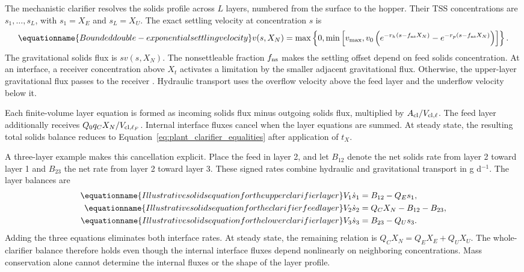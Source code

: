 The mechanistic clarifier resolves the solids profile across $L$ layers, numbered from the surface to the hopper. Their TSS concentrations are $s_1,\ldots,s_L$, with $s_1=X_E$ and $s_L=X_U$. The exact settling velocity at concentration $s$ is
\begin{equation}
\equationname{Bounded double-exponential settling velocity}
v(s,X_N)=\max\left\{0,\min\left[v_{\max},
v_0\left(e^{-r_h(s-f_{\rm ns}X_N)}-e^{-r_p(s-f_{\rm ns}X_N)}\right)\right]\right\}.
\label{eq:plant_settling_velocity}
\end{equation}
The gravitational solids flux is $sv(s,X_N)$. The nonsettleable fraction $f_{\rm ns}$ makes the settling offset depend on feed solids concentration. At an interface, a receiver concentration above $X_t$ activates a limitation by the smaller adjacent gravitational flux. Otherwise, the upper-layer gravitational flux passes to the receiver \citep{Takacs1991}. Hydraulic transport uses the overflow velocity above the feed layer and the underflow velocity below it.

Each finite-volume layer equation is formed as incoming solids flux minus outgoing solids flux, multiplied by $A_{\rm cl}/V_{{\rm cl},\ell}$. The feed layer additionally receives $Q_0q_CX_N/V_{{\rm cl},\ell_F}$. Internal interface fluxes cancel when the layer equations are summed. At steady state, the resulting total solids balance reduces to Equation~\eqref{eq:plant_clarifier_equalities} after application of $t_X$.

A three-layer example makes this cancellation explicit. Place the feed in layer 2, and let $B_{12}$ denote the net solids rate from layer 2 toward layer 1 and $B_{23}$ the net rate from layer 2 toward layer 3. These signed rates combine hydraulic and gravitational transport in g d$^{-1}$. The layer balances are
\begin{align}
\equationname{Illustrative solids equation for the upper clarifier layer}
V_1\dot s_1&=B_{12}-Q_Es_1,\\
\equationname{Illustrative solids equation for the clarifier feed layer}
V_2\dot s_2&=Q_CX_N-B_{12}-B_{23},\\
\equationname{Illustrative solids equation for the lower clarifier layer}
V_3\dot s_3&=B_{23}-Q_Us_3.
\end{align}
Adding the three equations eliminates both interface rates. At steady state, the remaining relation is $Q_CX_N=Q_EX_E+Q_UX_U$. The whole-clarifier balance therefore holds even though the internal interface fluxes depend nonlinearly on neighboring concentrations. Mass conservation alone cannot determine the internal fluxes or the shape of the layer profile.

